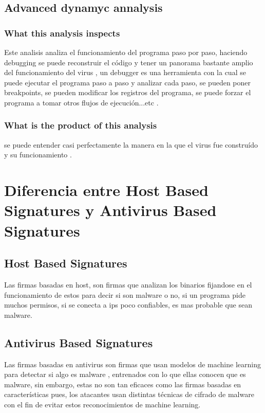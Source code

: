 \documentclass[10pt,a4paper]{article} %
\begin{document}
            \subsection{Advanced dynamyc annalysis}
                 \subsubsection{What this analysis inspects}
                    Este analisis analiza el funcionamiento del programa paso
                    por paso, haciendo debugging se puede reconstruir el código
                    y tener un panorama bastante amplio del funcionamiento del
                    virus , un debugger es una herramienta con la cual se puede
                    ejecutar el programa paso a paso y analizar cada paso, se
                    pueden poner breakpoints, se pueden modificar los registros
                    del programa, se puede forzar el programa a tomar otros
                    flujos de ejecución...etc .

                 \subsubsection{What is the product of this analysis}
                    se puede entender casi perfectamente la manera en la que el
                    virus fue construído y su funcionamiento .

        \section{Diferencia entre Host Based Signatures y Antivirus Based Signatures}
           \subsection{Host Based Signatures}
                Las firmas basadas en host, son firmas que analizan los
                binarios fijandose en el funcionamiento de estos para decir si
                son malware o no, si un programa pide muchos permisos, si se
                conecta a ips poco confiables, es mas probable que sean malware.
                
           \subsection{Antivirus Based Signatures}
                Las firmas basadas en antivirus son firmas que usan modelos de
                machine learning para detectar si algo es malware , entrenados
                con lo que ellas conocen que es malware, sin embargo, estas no
                son tan eficaces como las firmas basadas en características
                pues, los atacantes usan distintas técnicas de cifrado de
                malware con el fin de evitar estos reconocimientos de machine
                learning.
               
\end{document}
